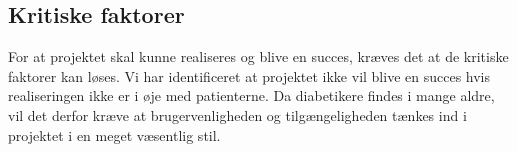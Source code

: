 \subsection{Kritiske faktorer}
For at projektet skal kunne realiseres og blive en succes, kræves det at de kritiske faktorer kan løses. Vi har identificeret at projektet ikke vil blive en succes hvis realiseringen ikke er i øje med patienterne. Da diabetikere findes i mange aldre, vil det derfor kræve at brugervenligheden og tilgængeligheden tænkes ind i projektet i en meget væsentlig stil.